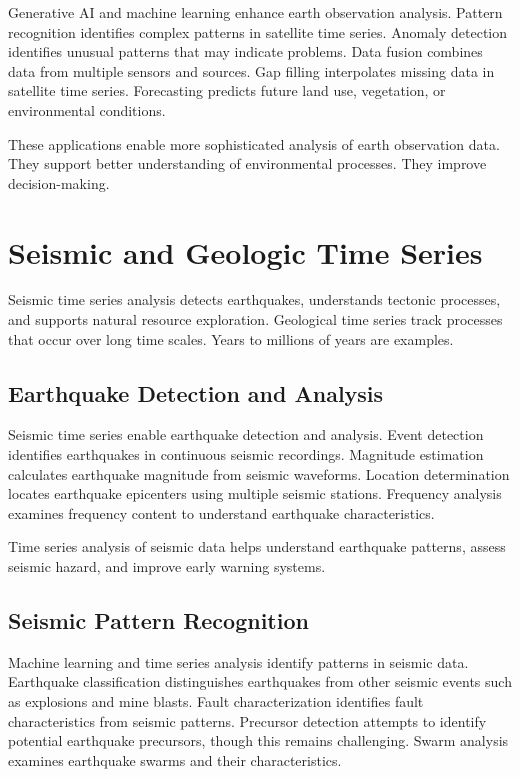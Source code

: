 Generative AI and machine learning enhance earth observation analysis. Pattern recognition identifies complex patterns in satellite time series. Anomaly detection identifies unusual patterns that may indicate problems. Data fusion combines data from multiple sensors and sources. Gap filling interpolates missing data in satellite time series. Forecasting predicts future land use, vegetation, or environmental conditions.

These applications enable more sophisticated analysis of earth observation data. They support better understanding of environmental processes. They improve decision-making.

\section{Seismic and Geologic Time Series}

Seismic time series analysis detects earthquakes, understands tectonic processes, and supports natural resource exploration. Geological time series track processes that occur over long time scales. Years to millions of years are examples.

\subsection{Earthquake Detection and Analysis}

Seismic time series enable earthquake detection and analysis. Event detection identifies earthquakes in continuous seismic recordings. Magnitude estimation calculates earthquake magnitude from seismic waveforms. Location determination locates earthquake epicenters using multiple seismic stations. Frequency analysis examines frequency content to understand earthquake characteristics.

Time series analysis of seismic data helps understand earthquake patterns, assess seismic hazard, and improve early warning systems.

\subsection{Seismic Pattern Recognition}

Machine learning and time series analysis identify patterns in seismic data. Earthquake classification distinguishes earthquakes from other seismic events such as explosions and mine blasts. Fault characterization identifies fault characteristics from seismic patterns. Precursor detection attempts to identify potential earthquake precursors, though this remains challenging. Swarm analysis examines earthquake swarms and their characteristics.

